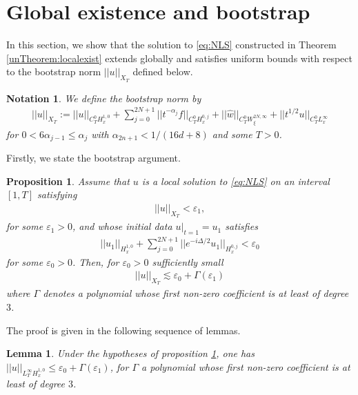 \documentclass[a4paper, 15pt]{article}
\numberwithin{equation}{section}
\newtheorem{propal}[defi]{Proposition}
\newtheorem{lem}[defi]{Lemma}
\newtheorem{nota}[defi]{Notation}
\begin{document}
\section{Global existence and bootstrap}
\label{section:bootstrap}
In this section, we show that the solution to \eqref{eq:NLS} constructed in Theorem \ref{unTheorem:localexist} extends globally and satisfies uniform bounds with respect to the bootstrap norm $||u||_{X_T}$ defined below.\\
\begin{nota}
\label{nota:bootstrapnorm}
We define the bootstrap norm by 
\begin{align}
||u||_{X_T}:=||u||_{C^0_TH^{1,0}_x}+\sum^{2N+1}_{j=0}||t^{-\alpha_j}f||_{C^0_TH^{0,j}_x}+||\hat{w}||_{C^0_TW^{2N,\infty}_\xi}+||t^{1/2}u||_{C^0_TL^\infty_x}
\end{align}
for $0<6\alpha_{j-1}\leq\alpha_j$ with $\alpha_{2n+1}<1/(16d+8)$ and some $T>0$.
\end{nota}
Firstly, we state the bootstrap argument. \\
\begin{propal}
\label{propal:bootstrap}
Assume that $u$ is a local solution to \eqref{eq:NLS} on an interval $[1,T]$ satisfying
\begin{align}
||u||_{X_T}<\varepsilon_1,
\end{align}
for some $\varepsilon_1>0$, and whose initial data $u|_{t=1}=u_1$ satisfies 
\begin{align}
||u_1||_{H^{1,0}_x}+\sum^{2N+1}_{j=0}||e^{-i\Delta/2}u_1||_{H^{0,j}_x}<\varepsilon_0
\end{align}
for some $\varepsilon_0>0$. Then, for $\varepsilon_0>0$ sufficiently small
\begin{align}
||u||_{X_T}\lesssim \varepsilon_0+\Gamma(\varepsilon_1)
\end{align}
where $\Gamma$ denotes a polynomial whose first non-zero coefficient is at least of degree $3$.
\end{propal}
The proof is given in the following sequence of lemmas. \\
\begin{lem}
Under the hypotheses of proposition \ref{propal:bootstrap}, one has 
$||u||_{L^\infty_TH^{1,0}_x}\leq \varepsilon_0 +\Gamma(\varepsilon_1)$,
for $\Gamma$ a polynomial whose first non-zero coefficient is at least of degree $3$. 
\end{lem}
\end{document}
